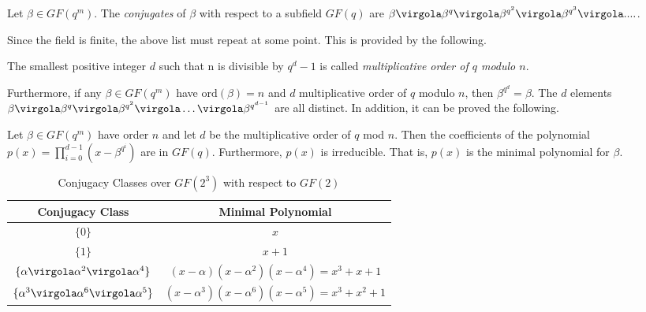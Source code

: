 \begin{Def}
Let $\beta \in GF(q^m)$. The \emph{conjugates} of \(\beta\) with respect to a subfield \(GF(q)\) are \( \beta \virgola \beta^q \virgola \beta^{q^2} \virgola \beta^{q^3} \virgola .... \).
\end{Def}
Since the field is finite, the above list must repeat at some point. This is provided by the following.
\begin{Def}
The smallest positive integer \(d\) such that n is divisible by \(q^d-1\) is called \emph{multiplicative order of \(q\) modulo \(n\)}.
\end{Def}
Furthermore, if any \(\beta \in GF(q^m)\) have \( \mathrm{ord}(\beta)=n\) and \(d\) multiplicative order of \(q\) modulo \(n\), then \(\beta^{q^d} = \beta\). The \(d\) elements
\( \beta \virgola \beta^q \virgola \beta^{q^2}  \virgola \ldots \virgola \beta^{q^{d-1}} \)
are all distinct. In addition, it can be proved the following.

\begin{Theorem} 
Let \(\beta \in GF(q^m) \) have order \(n\) and let \(d\) be the multiplicative order of \(q\) mod \(n\). Then the coefficients of the polynomial
\(p(x)=\prod_{i=0}^{d-1}{(x-\beta^{q^i})} \)
are in $GF(q)$. Furthermore, $p(x)$ is irreducible. That is, \(p(x)\) is the minimal polynomial for \(\beta\).
\end{Theorem}

\begin{table}\centering
\begin{tabular}{c| c}
Conjugacy Class & Minimal Polynomial\\
\hline
\(\{ 0\}\) & \(x\) \\
\(\{ 1\}\) & \(x+1\) \\
\(\{ \alpha \virgola \alpha^2 \virgola \alpha^4 \}\) &
\( (x-\alpha)(x-\alpha^2)(x-\alpha^4)= x^3+x+1 \) \\
\(\{ \alpha^3 \virgola \alpha^6 \virgola \alpha^5 \}\) &
\( (x-\alpha^3)(x-\alpha^6)(x-\alpha^5)= x^3+x^2+1 \)
\end{tabular}
\caption{ Conjugacy Classes over \(GF(2^3)\) with respect to \(GF(2)\) \label{tb:MinPoly3}}
\end{table}

